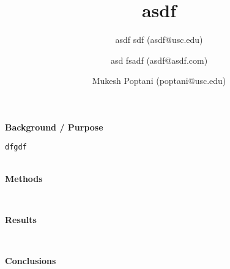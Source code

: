 \documentclass[11pt]{article}
\title{\vspace{-1cm}asdf
}
\author[]{asdf sdf (asdf@usc.edu)}\author[]{asd fsadf (asdf@asdf.com)}\author[]{Mukesh Poptani (poptani@usc.edu)}
\affil[]{}
\date{}
\begin{document}
\maketitle
\thispagestyle{fancyfirst}
{\bfseries\large Background / Purpose}
\begin{lstlisting}[mathescape]
dfgdf
\end{lstlisting}
\hfill \\
{\bfseries\large Methods}
\begin{lstlisting}[mathescape]

\end{lstlisting}
\hfill \\
{\bfseries\large Results}
\begin{lstlisting}[mathescape]

\end{lstlisting}
\hfill \\
{\bfseries\large Conclusions}
\begin{lstlisting}[mathescape]

\end{lstlisting}
\hfill \\
\end{document}
